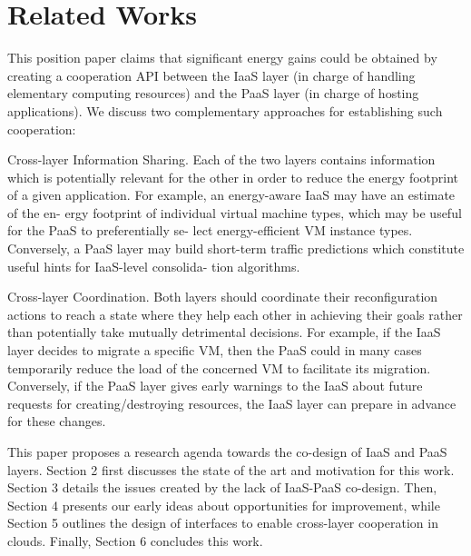 \section{Related Works}
\label{sec: relworks}

This position paper claims that significant energy gains could be obtained by creating a cooperation API between the IaaS layer (in charge of handling elementary computing resources) and the PaaS layer (in charge of hosting applications). We discuss two complementary approaches for establishing such cooperation:

Cross-layer Information Sharing. Each of the
two layers contains information which is potentially
relevant for the other in order to reduce the energy
footprint of a given application. For example, an
energy-aware IaaS may have an estimate of the en-
ergy footprint of individual virtual machine types,
which may be useful for the PaaS to preferentially se-
lect energy-efficient VM instance types. Conversely,
a PaaS layer may build short-term traffic predictions
which constitute useful hints for IaaS-level consolida-
tion algorithms.


Cross-layer Coordination. Both layers should coordinate their reconfiguration actions to reach a state where they help each other in achieving their goals rather than potentially take mutually detrimental decisions. For example, if the IaaS layer decides to migrate a specific VM, then the PaaS could in many cases temporarily reduce the load of the concerned VM to facilitate its migration. Conversely, if the PaaS layer gives early warnings to the IaaS about future
requests for creating/destroying resources, the IaaS layer can prepare in advance for these changes. 

This paper proposes a research agenda towards the co-design of IaaS and PaaS layers. Section 2 first discusses the state of the art and motivation for this work. Section 3 details the issues created by the lack of IaaS-PaaS co-design. Then, Section 4 presents our early ideas about opportunities for improvement, while Section 5 outlines the design of interfaces to enable cross-layer cooperation in clouds. Finally, Section 6 concludes this work.
